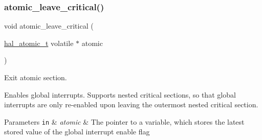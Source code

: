 \subsubsection{\texorpdfstring{atomic\+\_\+leave\+\_\+critical()}{atomic\_leave\_critical()}}
{\footnotesize\ttfamily void atomic\+\_\+leave\+\_\+critical (\begin{DoxyParamCaption}\item[{\hyperlink{group__doc__driver__hal__helper__atomic_ga6b3a0c9eea25111ac1877e0302e2fe1c}{hal\+\_\+atomic\+\_\+t} volatile $\ast$}]{atomic }\end{DoxyParamCaption})}



Exit atomic section. 

Enables global interrupts. Supports nested critical sections, so that global interrupts are only re-\/enabled upon leaving the outermost nested critical section.


\begin{DoxyParams}[1]{Parameters}
\mbox{\tt in}  & {\em atomic} & The pointer to a variable, which stores the latest stored value of the global interrupt enable flag \\
\hline
\end{DoxyParams}
